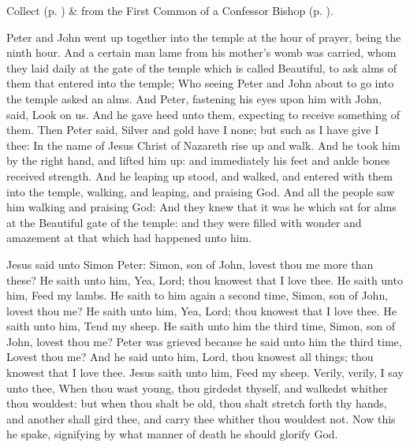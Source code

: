 \begin{rubric}
	 Collect  (p. \pageref{JohnBaptistCollect}) \&   from the First Common of a Confessor Bishop (p. \pageref{CommonConfessorBishopICollect}).
\end{rubric}

 Peter and John went up together into the temple at the hour of prayer, being the ninth hour. And a certain man lame from his mother's womb was carried, whom they laid daily at the gate of the temple which is called Beautiful, to ask alms of them that entered into the temple; Who seeing Peter and John about to go into the temple asked an alms. And Peter, fastening his eyes upon him with John, said, Look on us. And he gave heed unto them, expecting to receive something of them. Then Peter said, Silver and gold have I none; but such as I have give I thee: In the name of Jesus Christ of Nazareth rise up and walk. And he took him by the right hand, and lifted him up: and immediately his feet and ankle bones received strength. And he leaping up stood, and walked, and entered with them into the temple, walking, and leaping, and praising God. And all the people saw him walking and praising God: And they knew that it was he which sat for alms at the Beautiful gate of the temple: and they were filled with wonder and amazement at that which had happened unto him.


 Jesus said unto Simon Peter: Simon, son of John, lovest thou me more than these? He saith unto him, Yea, Lord; thou knowest that I love thee. He saith unto him, Feed my lambs. He saith to him again a second time, Simon, son of John, lovest thou me? He saith unto him, Yea, Lord; thou knowest that I love thee. He saith unto him, Tend my sheep. He saith unto him the third time, Simon, son of John, lovest thou me? Peter was grieved because he said unto him the third time, Lovest thou me? And he said unto him, Lord, thou knowest all things; thou knowest that I love thee. Jesus saith unto him, Feed my sheep. Verily, verily, I say unto thee, When thou wast young, thou girdedst thyself, and walkedst whither thou wouldest: but when thou shalt be old, thou shalt stretch forth thy hands, and another shall gird thee, and carry thee whither thou wouldest not. Now this he spake, signifying by what manner of death he should glorify God. 

